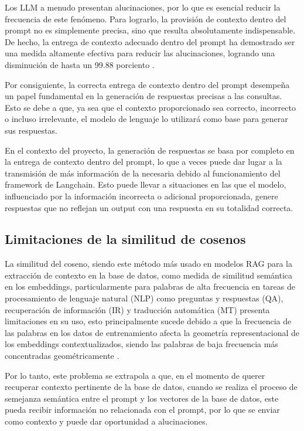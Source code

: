 Los LLM a menudo presentan alucinaciones, por lo que es esencial reducir la frecuencia de este fenómeno. 
Para lograrlo, la provisión de contexto dentro del prompt no es simplemente precisa, sino que resulta 
absolutamente indispensable. De hecho, la entrega de contexto adecuado dentro del prompt ha demostrado 
ser una medida altamente efectiva para reducir las alucinaciones, logrando una disminución de hasta un 
99.88 porciento \cite{riego1}.

Por consiguiente, la correcta entrega de contexto dentro del prompt desempeña un papel fundamental en 
la generación de respuestas precisas a las consultas. Esto se debe a que, ya sea que el contexto 
proporcionado sea correcto, incorrecto o incluso irrelevante, el modelo de lenguaje lo utilizará como base 
para generar sus respuestas.

En el contexto del proyecto, la generación de respuestas se basa por completo en la entrega de contexto 
dentro del prompt, lo que a veces puede dar lugar a la transmisión de más información de la necesaria 
debido al funcionamiento del framework de Langchain. Esto puede llevar a situaciones en las que el modelo, 
influenciado por la información incorrecta o adicional proporcionada, genere respuestas que no reflejan 
un output con una respuesta en su totalidad correcta.

\subsection{Limitaciones de la similitud de cosenos}

La similitud del coseno, siendo este método más usado en modelos RAG para la extracción de contexto en la base de datos, 
como medida de similitud semántica en los embeddings, particularmente para palabras de alta frecuencia en tareas de 
procesamiento de lenguaje natural (NLP) como preguntas y respuestas (QA), recuperación de información (IR) y traducción 
automática (MT) presenta limitaciones en su uso, esto principalmente sucede debido a que la frecuencia de las palabras en los 
datos de entrenamiento afecta la geometría representacional de los embeddings contextualizados, siendo las palabras de baja 
frecuencia más concentradas geométricamente \cite{coseno}.

Por lo tanto, este problema se extrapola a que, en el momento de querer recuperar contexto pertinente de la base de datos, 
cuando se realiza el proceso de semejanza semántica entre el prompt y los vectores de la base de datos, este pueda recibir 
información no relacionada con el prompt, por lo que se enviar como contexto y puede dar oportunidad a alucinaciones.


